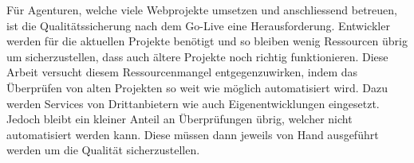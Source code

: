 Für Agenturen, welche viele Webprojekte umsetzen und anschliessend betreuen, ist die Qualitätssicherung nach dem Go-Live eine Herausforderung. Entwickler werden für die aktuellen Projekte benötigt und so bleiben wenig Ressourcen übrig um sicherzustellen, dass auch ältere Projekte noch richtig funktionieren. Diese Arbeit versucht diesem Ressourcenmangel entgegenzuwirken, indem das Überprüfen von alten Projekten so weit wie möglich automatisiert wird. Dazu werden Services von Drittanbietern wie auch Eigenentwicklungen eingesetzt. Jedoch bleibt ein kleiner Anteil an Überprüfungen übrig, welcher nicht automatisiert werden kann. Diese müssen dann jeweils von Hand ausgeführt werden um die Qualität sicherzustellen.